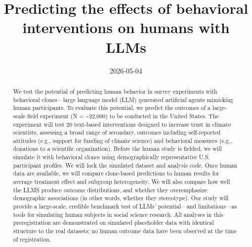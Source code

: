 \documentclass[
  letterpaper,
  DIV=11,
  numbers=noendperiod]{scrartcl}
\title{Predicting the effects of behavioral interventions on humans with
LLMs}
\author{}
\date{2026-05-04}
\renewcommand*\contentsname{Table of contents}
\newcommand\contentsname{Table of contents}
\begin{document}
\maketitle
\begin{abstract}
We test the potential of predicting human behavior in survey experiments
with behavioral clones---large language model (LLM) generated artificial
agents mimicking human participants. To evaluate this potential, we
predict the outcomes of a large-scale field experiment (N =
\textasciitilde22,000) to be conducted in the United States. The
experiment will test 20 text-based interventions designed to increase
trust in climate scientists, assessing a broad range of secondary,
outcomes including self-reported attitudes (e.g., support for funding of
climate science) and behavioral measures (e.g., donations to a
scientific organization). Before the human study is fielded, we will
simulate it with behavioral clones using demographically representative
U.S. participant profiles. We will lock the simulated dataset and
analysis code. Once human data are available, we will compare
clone-based predictions to human results for average treatment effect
and subgroup heterogeneity. We will also compare how well the LLMS
produce outcome distributions, and whether they overemphasize
demographic associations (in other words, whether they stereotype). Our
study will provide a large-scale, credible benchmark test of LLMs'
potential---and limitations---as tools for simulating human subjects in
social science research. All analyses in this preregistration are
demonstrated on simulated placeholder data with identical structure to
the real datasets; no human outcome data have been observed at the time
of registration.
\end{abstract}

\clearpage

\renewcommand*\contentsname{Table of contents}
{
\hypersetup{linkcolor=}
\setcounter{tocdepth}{5}
\tableofcontents
}
\end{document}

